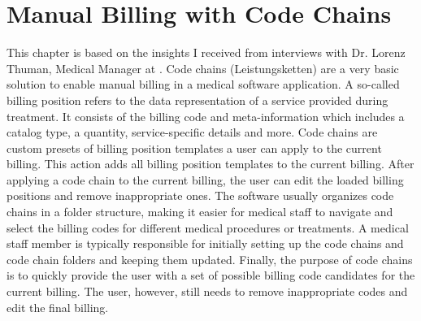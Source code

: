\section{Manual Billing with Code Chains}\label{sec:billing-positions-and-code-chains}
This chapter is based on the insights I received from interviews with Dr. Lorenz Thuman, Medical Manager at \AV.
Code chains (Leistungsketten) are a very basic solution to enable manual billing in a medical software application.
A so-called billing position refers to the data representation of a service provided during treatment.
It consists of the billing code and meta-information which includes a catalog type, a quantity, service-specific details and more.
Code chains are custom presets of billing position templates a user can apply to the current billing.
This action adds all billing position templates to the current billing.
After applying a code chain to the current billing, the user can edit the loaded billing positions and remove inappropriate ones.
The software usually organizes code chains in a folder structure,
making it easier for medical staff to navigate and select the billing codes for different medical procedures or treatments.
A medical staff member is typically responsible for initially setting up the code chains and code chain folders and keeping them updated.
Finally, the purpose of code chains is to quickly provide the user with a set of possible billing code candidates for the current billing.
The user, however, still needs to remove inappropriate codes and edit the final billing.



